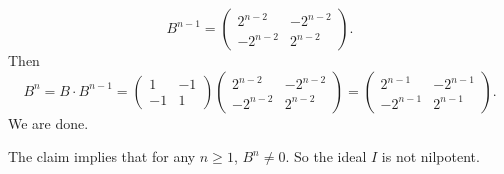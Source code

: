 \documentclass[a4paper, 12pt]{article}
\begin{document}
\begin{solution}
\begin{claimproof}
\[B^{n-1}=\begin{pmatrix}
    2^{n-2}&-2^{n-2}\\ 
    -2^{n-2}&2^{n-2}
\end{pmatrix}.\]
Then 
\[B^n=B\cdot B^{n-1}=\begin{pmatrix}
    1&-1\\ 
    -1&1
\end{pmatrix}\begin{pmatrix}
    2^{n-2}&-2^{n-2}\\ 
    -2^{n-2}&2^{n-2}
\end{pmatrix}=\begin{pmatrix}
    2^{n-1}&-2^{n-1}\\ 
    -2^{n-1}&2^{n-1}
\end{pmatrix}.\]
We are done.
\end{claimproof}

The claim implies that for any \(n\geq 1\), \(B^n\neq 0\). So the ideal \(I\) is not nilpotent.
\end{solution}
\end{document}
